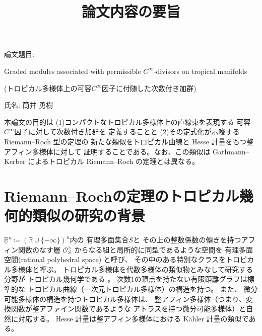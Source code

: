 \documentclass[uplatex,dvipdfmx,12pt]{jsarticle}
\title{論文内容の要旨
}
\date{}
\numberwithin{equation}{section}
\theoremstyle{definition}
\newcommand{\deq}{\coloneqq}
\newcommand{\beforesection}{\vspace{-15pt}}
\newcommand{\aftersection}{\vspace{-8pt}}
\begin{document}
\setlength{\baselineskip}{-5pt}
\setlength{\parskip}{2pt}


\maketitle
{\large
\noindent
論文題目:

Graded modules associated 
with permissible $C^{\infty}$-divisors on tropical manifolds

(トロピカル多様体上の可容$C^{\infty}$因子に付随した次数付き加群)
}

\vspace{5pt}

\noindent
{\large
氏名: 筒井 勇樹
}

\vspace{10pt}

\setlength{\baselineskip}{4pt}
\setlength{\parskip}{3pt}

本論文の目的は
(1)コンパクトなトロピカル多様体上の直線束を表現する
可容$C^{\infty}$因子に対して次数付き加群を
定義することと
(2)その定式化が示唆する Riemann--Roch 型の定理の
新たな類似をトロピカル曲線と Hesse 計量をもつ整アフィン多様体に対して
証明することである。なお、この類似は Gathmann--Kerber
によるトロピカル Riemann--Roch の定理とは異なる。

\beforesection

\section{Riemann--Rochの定理のトロピカル幾何的類似の研究の背景}

\aftersection

$\underline{\mathbb{R}}^{n} \deq (\mathbb{R}\cup\{-\infty\})^{n}$内の
有理多面集合$S$と
その上の整数係数の傾きを持つアフィン関数のなす層 
$\mathcal{O}_S^{\times}$
からなる組と局所的に同型であるような空間を
有理多面空間(rational polyhedral space)
と呼び、
その中のある特別なクラスをトロピカル多様体と呼ぶ。
トロピカル多様体を代数多様体の類似物とみなして研究する分野が
トロピカル幾何学である
\cite{mikhalkinTropicalEigenwaveIntermediate2014a,
gross2019sheaftheoretic}。
次数$1$の頂点を持たない有限距離グラフは標準的な
トロピカル曲線（一次元トロピカル多様体）の構造を持つ。
また、
微分可能多様体の構造を持つトロピカル多様体は、
整アフィン多様体（つまり、変換関数が整アファイン関数であるような
アトラスを持つ微分可能多様体）と自然に対応する。
Hesse 計量は整アフィン多様体における
K\"ahler 計量の類似である。
\end{document}
